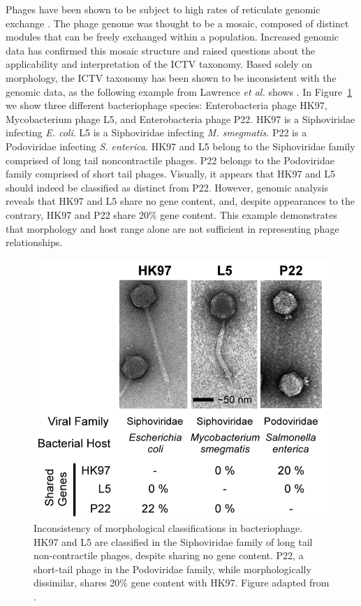 Phages have been shown to be subject to high rates of reticulate genomic exchange \cite{Westmoreland:1969dd}.
The phage genome was thought to be a mosaic, composed of distinct modules that can be freely exchanged within a population.
Increased genomic data has confirmed this mosaic structure and raised questions about the applicability and interpretation of the ICTV taxonomy.
Based solely on morphology, the ICTV taxonomy has been shown to be inconsistent with the genomic data, as the following example from Lawrence \emph{et al.} shows \cite{Lawrence:2002eg}.
In Figure~\ref{phage:fig:inconsistency} we show three different bacteriophage species: Enterobacteria phage HK97, Mycobacterium phage L5, and Enterobacteria phage P22.
HK97 is a Siphoviridae infecting \emph{E. coli}.
L5 is a Siphoviridae infecting \emph{M. smegmatis}.
P22 is a Podoviridae infecting \emph{S. enterica}.
HK97 and L5 belong to the Siphoviridae family comprised of long tail noncontractile phages.
P22 belongs to the Podoviridae family comprised of short tail phages.
Visually, it appears that HK97 and L5 should indeed be classified as distinct from P22.
However, genomic analysis reveals that HK97 and L5 share no gene content, and, despite appearances to the contrary, HK97 and P22 share 20\% gene content.
This example demonstrates that morphology and host range alone are not sufficient in representing phage relationships.

\begin{figure}
\centering
\includegraphics[width=.5\linewidth]{./fig/phage/LAWRENCE_phage_comparative.png}
\caption[Inconsistency of morphological classifications in bacteriophage]{Inconsistency of morphological classifications in bacteriophage. HK97 and L5 are classified in the Siphoviridae family of long tail non-contractile phages, despite sharing no gene content. P22, a short-tail phage in the Podoviridae family, while morphologically dissimilar, shares 20\% gene content with HK97. Figure adapted from \parencite{Lawrence:2002eg}.}
\label{phage:fig:inconsistency}
\end{figure}

